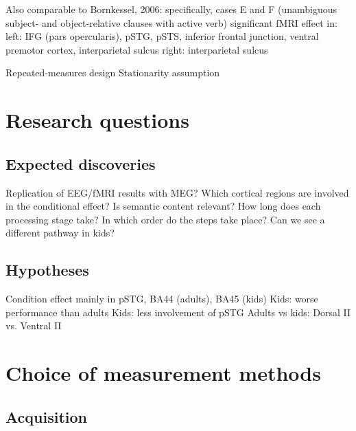 Also comparable to Bornkessel, 2006:
specifically, cases E and F (unambiguous subject- and object-relative clauses with active verb)
significant fMRI effect in:
left: IFG (pars opercularis), pSTG, pSTS, inferior frontal junction, ventral premotor cortex, interparietal sulcus
right: interparietal sulcus

Repeated-measures design
Stationarity assumption

\section{Research questions}

\subsection{Expected discoveries}
Replication of EEG/fMRI results with MEG?
Which cortical regions are involved in the conditional effect?
Is semantic content relevant?
How long does each processing stage take?
In which order do the steps take place?
Can we see a different pathway in kids?

\subsection{Hypotheses}
Condition effect mainly in pSTG, BA44 (adults), BA45 (kids)
Kids: worse performance than adults
Kids: less involvement of pSTG
Adults vs kids: Dorsal II vs. Ventral II\section{Choice of measurement methods}

\subsection{Acquisition}

